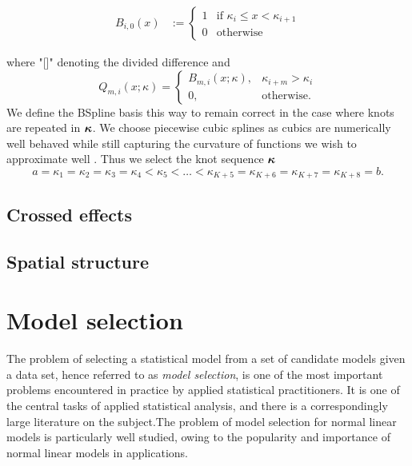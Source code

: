 \documentclass{amsart}[12pt]
\begin{document}
\begin{align*}
	B_{i, 0}(x) & := \begin{cases}                                                                                                        
	1           & \text{if } \kappa_i \leq x < \kappa_{i+1}                                                                                         \\
	0           & \text{otherwise}                                                                                                        
	\end{cases}
\end{align*}

where "[]" denoting the divided difference and
$$
Q_{m, i}(x; \kappa) =
\begin{cases}
B_{m, i}(x; \kappa),& \kappa_{i + m} > \kappa_i \\
0, & \text{otherwise}.
\end{cases}
$$
We define the BSpline basis this way to remain correct in the case where knots are repeated in ${\boldsymbol \kappa}$. We
choose piecewise cubic splines as cubics are numerically well behaved while still capturing the curvature of
functions we wish to approximate well \citep{Press:2007:NRE:1403886}. Thus we select the knot sequence
${\boldsymbol \kappa}$
$$
a = \kappa_1 = \kappa_2 = \kappa_3 = \kappa_4 < \kappa_5 < \ldots < \kappa_{K+5} = \kappa_{K+6} = \kappa_{K+7} = \kappa_{K+8} = b.
$$

\subsection{Crossed effects}
\subsection{Spatial structure}

\section{Model selection}

The problem of selecting a statistical model from a set of candidate models given a data set, hence referred
to as \emph{model selection}, is one of the most important problems encountered in practice by applied
statistical practitioners. It is one of the central tasks of applied statistical analysis, and there is a
correspondingly large literature on the subject.The problem of model selection for normal linear models is
particularly well studied, owing to the popularity and importance of normal linear models in applications.
\end{document}
